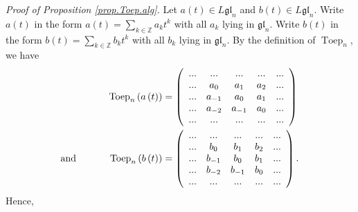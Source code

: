 \documentclass[etingof-lie.tex]{subfiles}
\begin{document}
\textit{Proof of Proposition \ref{prop.Toep.alg}.} Let $a\left(  t\right)  \in
L\mathfrak{gl}_{n}$ and $b\left(  t\right)  \in L\mathfrak{gl}_{n}$. Write
$a\left(  t\right)  $ in the form $a\left(  t\right)  =\sum\limits_{k\in
\mathbb{Z}}a_{k}t^{k}$ with all $a_{k}$ lying in $\mathfrak{gl}_{n}$. Write
$b\left(  t\right)  $ in the form $b\left(  t\right)  =\sum\limits_{k\in
\mathbb{Z}}b_{k}t^{k}$ with all $b_{k}$ lying in $\mathfrak{gl}_{n}$. By the
definition of $\operatorname*{Toep}\nolimits_{n}$, we have%
\begin{align*}
\operatorname*{Toep}\nolimits_{n}\left(  a\left(  t\right)  \right)   &
=\left(
\begin{array}
[c]{ccccc}%
... & ... & ... & ... & ...\\
... & a_{0} & a_{1} & a_{2} & ...\\
... & a_{-1} & a_{0} & a_{1} & ...\\
... & a_{-2} & a_{-1} & a_{0} & ...\\
... & ... & ... & ... & ...
\end{array}
\right) \\
\text{and}\ \ \ \ \ \ \ \ \ \ \operatorname*{Toep}\nolimits_{n}\left(
b\left(  t\right)  \right)   &  =\left(
\begin{array}
[c]{ccccc}%
... & ... & ... & ... & ...\\
... & b_{0} & b_{1} & b_{2} & ...\\
... & b_{-1} & b_{0} & b_{1} & ...\\
... & b_{-2} & b_{-1} & b_{0} & ...\\
... & ... & ... & ... & ...
\end{array}
\right)  .
\end{align*}
Hence,%
\end{document}
